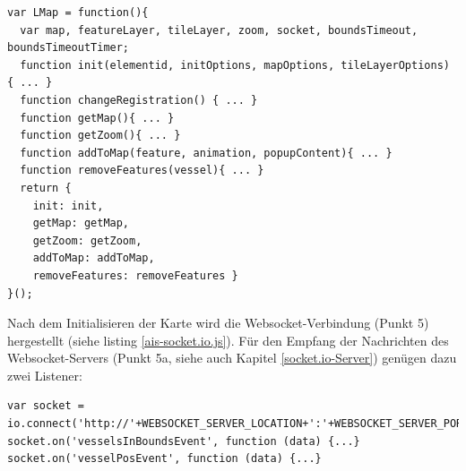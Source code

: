 \begin{lstlisting}[caption= ‘Revealing Module Pattern’ in LeafletMap.js, label=LeafletMap.js]
var LMap = function(){
  var map, featureLayer, tileLayer, zoom, socket, boundsTimeout, boundsTimeoutTimer;
  function init(elementid, initOptions, mapOptions, tileLayerOptions) { ... }
  function changeRegistration() { ... } 
  function getMap(){ ... }
  function getZoom(){ ... }
  function addToMap(feature, animation, popupContent){ ... } 
  function removeFeatures(vessel){ ... }
  return {
    init: init,
    getMap: getMap,
    getZoom: getZoom,
    addToMap: addToMap,
    removeFeatures: removeFeatures }
}();
\end{lstlisting}
Nach dem Initialisieren der Karte wird die Websocket-Verbindung (Punkt 5) hergestellt (siehe listing \ref{ais-socket.io.js}). Für den Empfang der Nachrichten des Websocket-Servers (Punkt 5a, siehe auch Kapitel \ref{socket.io-Server}) genügen dazu zwei Listener: 
\begin{lstlisting}[caption=Client-Seite der socket.io-Websocket-Verbindung in ais-socket.io.js,  label=ais-socket.io.js]
 var socket = io.connect('http://'+WEBSOCKET_SERVER_LOCATION+':'+WEBSOCKET_SERVER_PORT);
socket.on('vesselsInBoundsEvent', function (data) {...}
socket.on('vesselPosEvent', function (data) {...}
\end{lstlisting}

